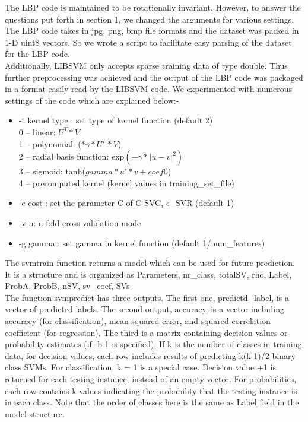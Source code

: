\documentclass[preprint,12pt]{elsarticle}
\begin{document}
The LBP code is maintained to be rotationally invariant. However, to answer the questions put forth in section 1, we changed the arguments for various settings. The LBP code takes in jpg, png, bmp file formats and the dataset was packed in 1-D uint8 vectors. So we wrote a script to facilitate easy parsing of the dataset for the LBP code.\\

Additionally, LIBSVM only accepts sparse training data of type double. Thus further preprocessing was achieved and the output of the LBP code was packaged in a format easily read by the LIBSVM code. We experimented with numerous settings of the code which are explained below:-\\

\begin{itemize}
\item -t kernel type : set type of kernel function (default 2)\\
	0 -- linear: $U^T*V$ \\
	1 -- polynomial: (*$\gamma*U^T*V$)\\
	2 -- radial basis function: exp$(-\gamma*|u-v|^2)$\\
	3 -- sigmoid: tanh($gamma*u'*v + coef0$)\\
	4 -- precomputed kernel (kernel values in training\_set\_file)\\
\item -c cost : set the parameter C of C-SVC, $\epsilon$\_SVR (default 1)
\item -v n: n-fold cross validation mode
\item -g gamma : set gamma in kernel function (default 1/num\_features)
\end{itemize}

The svmtrain function returns a model which can be used for future
prediction. It is a structure and is organized as Parameters, nr\_class,
totalSV, rho, Label, ProbA, ProbB, nSV, sv\_coef, SVs\\

The function svmpredict has three outputs. The first one,
predictd\_label, is a vector of predicted labels. The second output,
accuracy, is a vector including accuracy (for classification), mean
squared error, and squared correlation coefficient (for regression).
The third is a matrix containing decision values or probability
estimates (if -b 1 is specified). If k is the number of classes
in training data, for decision values, each row includes results of 
predicting k(k-1)/2 binary-class SVMs. For classification, k = 1 is a
special case. Decision value +1 is returned for each testing instance,
instead of an empty vector. For probabilities, each row contains k values
indicating the probability that the testing instance is in each class.
Note that the order of classes here is the same as Label field
in the model structure.\\
\end{document}

